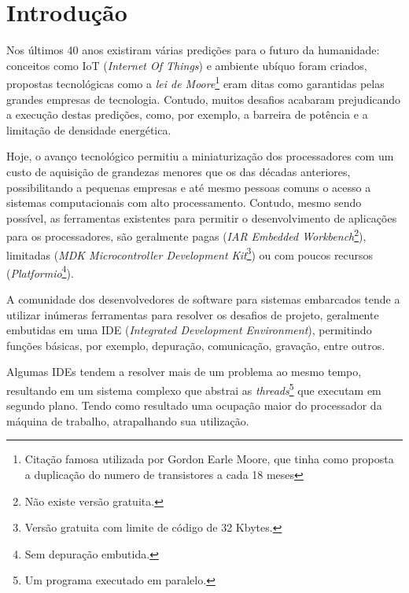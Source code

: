 \chapter{Introdução}
Nos últimos 40 anos existiram várias predições para o futuro da humanidade: conceitos como IoT (\textit{Internet Of Things})\cite{gates1995estrada} e ambiente ubíquo\cite{weiser1991computer} foram criados, propostas tecnológicas como a \textit{lei de Moore}\footnote{Citação famosa utilizada por Gordon Earle Moore, que tinha como proposta a duplicação do numero de transistores a cada 18 meses} eram ditas como garantidas pelas grandes empresas de tecnologia. Contudo, muitos desafios acabaram prejudicando a execução destas predições, como, por exemplo, a barreira de potência\cite{Patterson:2008:COD:1502247} e a limitação de densidade energética\cite{paradiso2005energy}.

Hoje, o avanço tecnológico permitiu a miniaturização dos processadores com um custo de aquisição de grandezas menores que os das décadas anteriores\cite{nordhaus2007two}, possibilitando a pequenas empresas e até mesmo pessoas comuns o acesso a sistemas computacionais com alto processamento. Contudo, mesmo	 sendo possível, as ferramentas existentes para permitir o desenvolvimento de aplicações para os processadores, são geralmente pagas (\textit{IAR Embedded Workbench}\footnote{Não existe versão gratuita\cite{buyiar}.}), limitadas (\textit{MDK Microcontroller Development Kit}\footnote{Versão gratuita com limite de código de 32 Kbytes.}) ou com poucos recursos (\textit{Platformio}\footnote{Sem depuração embutida.}).

A comunidade dos desenvolvedores de software para sistemas embarcados tende a utilizar inúmeras ferramentas para resolver os desafios de projeto, geralmente embutidas em uma IDE (\textit{Integrated Development Environment}), permitindo funções básicas, por exemplo, depuração, comunicação, gravação, entre outros.

Algumas IDEs tendem a resolver mais de um problema ao mesmo tempo, resultando em um sistema complexo que abstrai as \textit{threads}\footnote{Um programa executado em paralelo.\cite{Patterson:2008:COD:1502247}} que executam em segundo plano. Tendo como resultado uma ocupação maior do processador da máquina de trabalho, atrapalhando sua utilização.

\iffalse
O intuito deste trabalho é a realização de um sistema para possibilitar aos desenvolvedores a programação de sistemas embarcados, sem a necessidade de utilizar sistemas assistencialistas que possam limitar a evolução do trabalho ou a utilização do produto final concebido.
\fi

